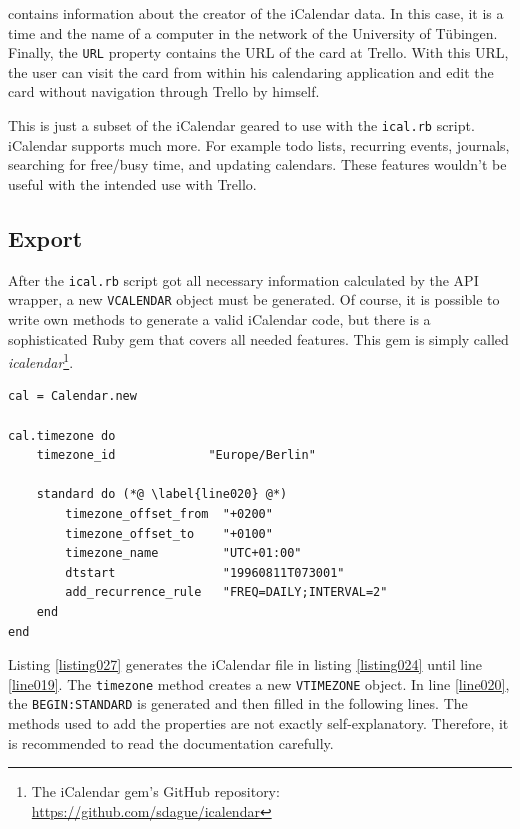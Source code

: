 contains information about the creator of the iCalendar data. In this case, it is a time and the name of a computer in the network of the University of Tübingen. Finally, the \lstinline{URL} property contains the URL of the card at Trello. With this URL, the user can visit the card from within his calendaring application and edit the card without navigation through Trello by himself. \cite{ical:specs}

This is just a subset of the iCalendar geared to use with the \texttt{ical.rb} script. iCalendar supports much more. For example todo lists, recurring events, journals, searching for free/busy time, and updating calendars. These features wouldn't be useful with the intended use with Trello. 

\subsection{Export}

After the \texttt{ical.rb} script got all necessary information calculated by the API wrapper, a new \lstinline{VCALENDAR} object must be generated. Of course, it is possible to write own methods to generate a valid iCalendar code, but there is a sophisticated Ruby gem that covers all needed features. This gem is simply called \emph{icalendar}\footnote{The iCalendar gem's GitHub repository: \url{https://github.com/sdague/icalendar}}.

\begin{lstlisting}[aboveskip=1\baselineskip, caption=Generating a new \lstinline{VCALENDAR}., label=listing027]
cal = Calendar.new

cal.timezone do
	timezone_id             "Europe/Berlin"
	
	standard do (*@ \label{line020} @*)
		timezone_offset_from  "+0200"
		timezone_offset_to    "+0100"
		timezone_name         "UTC+01:00"
		dtstart               "19960811T073001"
		add_recurrence_rule   "FREQ=DAILY;INTERVAL=2"
	end
end
\end{lstlisting}

Listing \ref{listing027} generates the iCalendar file in listing \ref{listing024} until line \ref{line019}. The \lstinline{timezone} method creates a new \lstinline{VTIMEZONE} object. In line \ref{line020}, the \lstinline{BEGIN:STANDARD} is generated and then filled in the following lines. The methods used to add the properties ​​are not exactly self-explanatory. Therefore, it is recommended to read the documentation carefully.

